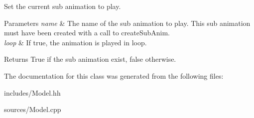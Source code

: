 Set the current sub animation to play. 


\begin{DoxyParams}{Parameters}
{\em name} & The name of the sub animation to play. This sub animation must have been created with a call to create\-Sub\-Anim. \\
\hline
{\em loop} & If true, the animation is played in loop. \\
\hline
\end{DoxyParams}
\begin{DoxyReturn}{Returns}
True if the sub animation exist, false otherwise. 
\end{DoxyReturn}


The documentation for this class was generated from the following files\-:\begin{DoxyCompactItemize}
\item 
includes/Model.\-hh\item 
sources/Model.\-cpp\end{DoxyCompactItemize}

